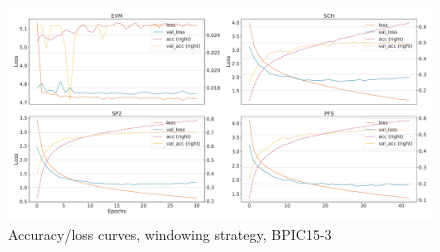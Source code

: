 \begin{figure}[!htb]
    \centering
    \includegraphics[width=\textwidth]{gfx/bpic2015_3/windowed_loss_acc_curve.pdf}
    \caption{Accuracy/loss curves, windowing strategy, BPIC15-3}
\end{figure}
\FloatBarrier

